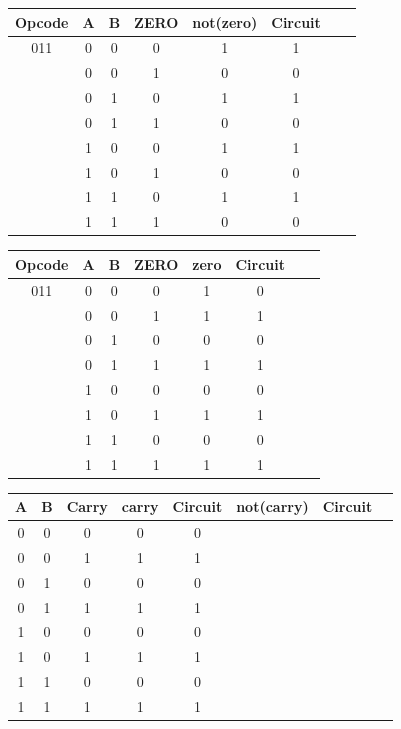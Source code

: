 \documentclass[a4paper]{article}
\begin{document}
\begin{tcolorbox}[colframe=Monokaimagenta,colback=white]
\begin{center}
\smallskip

\begin{tabular}{|c|c|c|c|c|c|cc|}
\hline
    Opcode & A & B & ZERO & not(zero) & Circuit\\
    \hline
    011    & 0 & 0 & 0     & 1             & 1 \\
           & 0 & 0 & 1     & 0             & 0\\
           & 0 & 1 & 0     & 1             & 1 \\
           & 0 & 1 & 1     & 0             & 0\\
           & 1 & 0 & 0     & 1             & 1\\
           & 1 & 0 & 1     & 0             & 0 \\
           & 1 & 1 & 0     & 1             & 1 \\
           & 1 & 1 & 1     & 0             & 0
          

\end{tabular}

\begin{tabular}{|c|c|c|c|c|c|cc|}
\hline
    Opcode & A & B & ZERO & zero & Circuit\\
    \hline
    011    & 0 & 0 & 0     & 1             & 0 \\
           & 0 & 0 & 1     & 1             & 1 \\
           & 0 & 1 & 0     & 0             & 0 \\
           & 0 & 1 & 1     & 1             & 1 \\
           & 1 & 0 & 0     & 0             & 0 \\
           & 1 & 0 & 1     & 1             & 1 \\
           & 1 & 1 & 0     & 0             & 0 \\
           & 1 & 1 & 1     & 1             & 1
          
\end{tabular}

\begin{tabular}{|c|c|c|c|c|c|c|c}
\hline
    A & B & Carry & carry & Circuit & not(carry) & Circuit\\
    \hline
    0 & 0 & 0     & 0     & 0       &     & \\
    0 & 0 & 1     & 1     & 1       &     & \\
    0 & 1 & 0     & 0     & 0       &     & \\
    0 & 1 & 1     & 1     & 1       &     & \\
    1 & 0 & 0     & 0     & 0       &     & \\
    1 & 0 & 1     & 1     & 1       &     & \\
    1 & 1 & 0     & 0     & 0       &     & \\
    1 & 1 & 1     & 1     & 1       &     & 
          
\end{tabular}



\end{center}

\end{tcolorbox}
\end{document}
